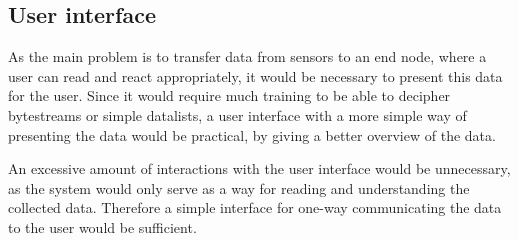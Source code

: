 \subsection{User interface}
As the main problem is to transfer data from sensors to an end node, where a user can read and react appropriately, it would be necessary to present this data for the user. Since it would require much training to be able to decipher bytestreams or simple datalists, a user interface with a more simple way of presenting the data would be practical, by giving a better overview of the data.

An excessive amount of interactions with the user interface would be unnecessary, as the system would only serve as a way for reading and understanding the collected data. Therefore a simple interface for one-way communicating the data to the user would be sufficient.
